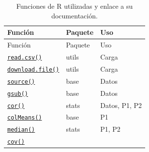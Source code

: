 \documentclass[oneside, openany, fontset=libertinus]{mitthesis}
\begin{document}
\begin{longtable}[]{@{}
  >{\raggedright\arraybackslash}p{}
  >{\raggedright\arraybackslash}p{}
  >{\raggedright\arraybackslash}p{}@{}}
\caption{Funciones de R utilizadas y enlace a su
documentación.}\tabularnewline
\toprule\noalign{}
\begin{minipage}[b]{\linewidth}\raggedright
Función
\end{minipage} & \begin{minipage}[b]{\linewidth}\raggedright
Paquete
\end{minipage} & \begin{minipage}[b]{\linewidth}\raggedright
Uso
\end{minipage} \\
\midrule\noalign{}
\endfirsthead
\toprule\noalign{}
\begin{minipage}[b]{\linewidth}\raggedright
Función
\end{minipage} & \begin{minipage}[b]{\linewidth}\raggedright
Paquete
\end{minipage} & \begin{minipage}[b]{\linewidth}\raggedright
Uso
\end{minipage} \\
\midrule\noalign{}
\endhead
\bottomrule\noalign{}
\endlastfoot
\href{https://stat.ethz.ch/R-manual/R-devel/library/utils/html/read.table.html}{\texttt{read.csv()}}
& utils & Carga \\
\href{https://stat.ethz.ch/R-manual/R-devel/library/utils/html/download.file.html}{\texttt{download.file()}}
& utils & Carga \\
\href{https://stat.ethz.ch/R-manual/R-devel/library/base/html/source.html}{\texttt{source()}}
& base & Datos \\
\href{https://stat.ethz.ch/R-manual/R-devel/library/base/html/grep.html}{\texttt{gsub()}}
& base & Datos \\
\href{https://stat.ethz.ch/R-manual/R-devel/library/stats/html/cor.html}{\texttt{cor()}}
& stats & Datos, P1, P2 \\
\href{https://stat.ethz.ch/R-manual/R-devel/library/base/html/colSums.html}{\texttt{colMeans()}}
& base & P1 \\
\href{https://stat.ethz.ch/R-manual/R-devel/library/stats/html/median.html}{\texttt{median()}}
& stats & P1, P2 \\
\href{https://stat.ethz.ch/R-manual/R-devel/library/stats/html/cor.html}{\texttt{cov()}}

\end{longtable}
\end{document}
